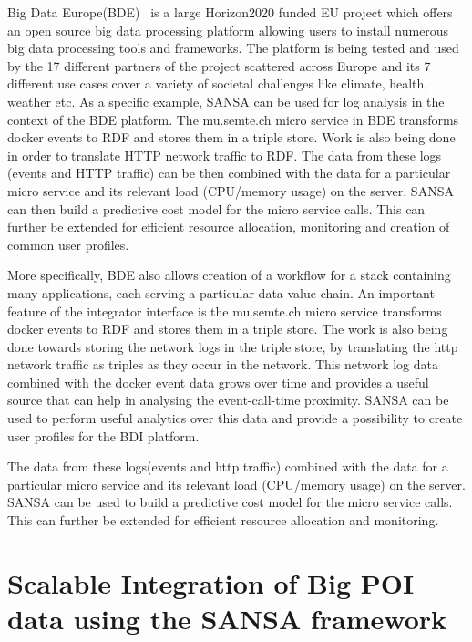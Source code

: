 Big Data Europe(BDE)~\cite{Auer+ICWE-2017} is a large Horizon2020 funded EU project which offers an open source big data processing platform allowing users to install numerous big data processing tools and frameworks. The platform is being tested and used by the 17 different partners of the project scattered across Europe and its 7 different use cases cover a variety of societal challenges like climate, health, weather etc. %
%
As a specific example, SANSA can be used for log analysis in the context of the BDE platform. 
The mu.semte.ch micro service in BDE transforms docker events to RDF and stores them in a triple store.
Work is also being done in order to translate HTTP network traffic to RDF. 
The data from these logs (events and HTTP traffic) can be then combined with the data for a particular micro service and its relevant load (CPU/memory usage) on the server. 
SANSA can then build a predictive cost model for the micro service calls. This can further be extended for efficient resource allocation, monitoring and creation of common user profiles.

More specifically, BDE also allows creation of a workflow for a stack containing many applications, each serving a particular data value chain. 
An important feature of the integrator interface is the mu.semte.ch micro service transforms docker events to RDF and stores them in a triple store. The work is also being done towards storing the network logs in the triple store, by translating the http network traffic as triples as they occur in the network.
This network log data combined with the docker event data grows over time and provides a useful source that can help in analysing the event-call-time proximity. 
SANSA can be used to perform useful analytics over this data and provide a possibility to create user profiles for the BDI platform. 

The data from these logs(events and http traffic) combined with the data for a particular micro service and its relevant load (CPU/memory usage) on the server. 
SANSA can be used to build a predictive cost model for the micro service calls. This can further be extended for efficient resource allocation and monitoring.


\section{Scalable Integration of Big POI data using the SANSA framework}
\label{sec:slipo-use-case}

